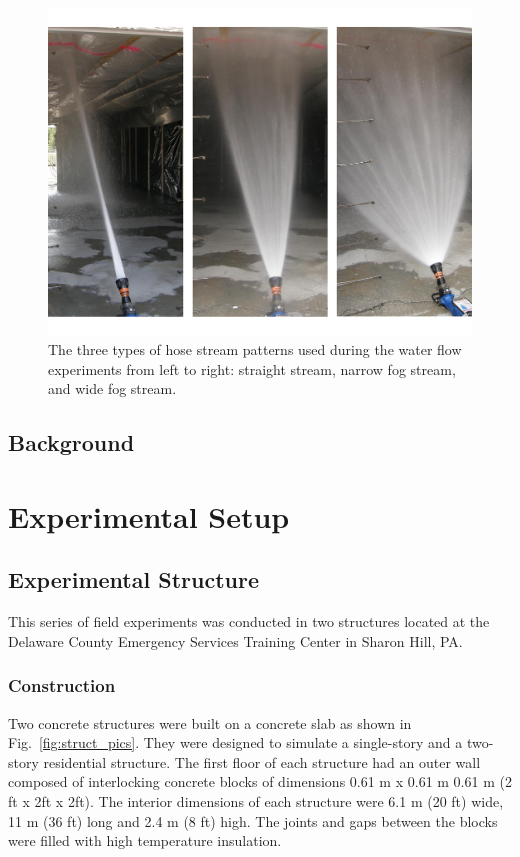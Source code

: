 \documentclass[12pt,oneside]{book}
\begin{document}
\begin{figure}[!ht]
\includegraphics[width=6in]{../Pictures/hose_streams.pdf}
\caption[Different Hose Stream Patterns]{The three types of hose stream patterns used during the water flow experiments from left to right: straight stream, narrow fog stream, and wide fog stream.}
\label{fig:hose_streams}
\end{figure}
\FloatBarrier

\section{Background}
\label{sec:Background}


\chapter{Experimental Setup}
\label{chap:Experimental_Setup}

\section{Experimental Structure}
\label{sec:Experimental_Structure}
This series of field experiments was conducted in two structures located at the Delaware County Emergency Services Training Center in Sharon Hill, PA. 

\subsection{Construction}
\label{sec:Construction}
Two concrete structures were built on a concrete slab as shown in Fig.~\ref{fig:struct_pics}. They were designed to simulate a single-story and a two-story residential structure.  The first floor of each structure had an outer wall composed of interlocking concrete blocks of dimensions 0.61 m x 0.61 m 0.61 m (2 ft x 2ft x 2ft). The interior dimensions of each structure were 6.1 m (20 ft) wide, 11 m (36 ft) long and 2.4 m (8 ft) high.  The joints and gaps between the blocks were filled with high temperature insulation.
\end{document}
